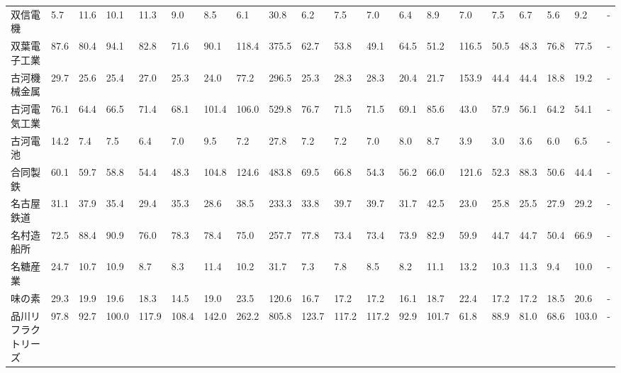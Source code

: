 \begin{longtable}[c]{lp{3mm}p{3mm}p{3mm}p{3mm}p{3mm}p{3mm}p{3mm}p{3mm}p{3mm}p{3mm}p{3mm}p{3mm}p{3mm}p{3mm}p{3mm}p{3mm}p{3mm}p{3mm}p{3mm}}
双信電機            &    5.7 &   11.6 &      10.1 &      11.3 &        9.0 &     8.5 &     6.1 &     30.8 &     6.2 &     7.5 &    7.0 &    6.4 &     8.9 &     7.0 &     7.5 &    6.7 &    5.6 &     9.2 &      - \\
双葉電子工業          &   87.6 &   80.4 &      94.1 &      82.8 &       71.6 &    90.1 &   118.4 &    375.5 &    62.7 &    53.8 &   49.1 &   64.5 &    51.2 &   116.5 &    50.5 &   48.3 &   76.8 &    77.5 &      - \\
古河機械金属          &   29.7 &   25.6 &      25.4 &      27.0 &       25.3 &    24.0 &    77.2 &    296.5 &    25.3 &    28.3 &   28.3 &   20.4 &    21.7 &   153.9 &    44.4 &   44.4 &   18.8 &    19.2 &      - \\
古河電気工業          &   76.1 &   64.4 &      66.5 &      71.4 &       68.1 &   101.4 &   106.0 &    529.8 &    76.7 &    71.5 &   71.5 &   69.1 &    85.6 &    43.0 &    57.9 &   56.1 &   64.2 &    54.1 &      - \\
古河電池            &   14.2 &    7.4 &       7.5 &       6.4 &        7.0 &     9.5 &     7.2 &     27.8 &     7.2 &     7.2 &    7.0 &    8.0 &     8.7 &     3.9 &     3.0 &    3.6 &    6.0 &     6.5 &      - \\
合同製鉄            &   60.1 &   59.7 &      58.8 &      54.4 &       48.3 &   104.8 &   124.6 &    483.8 &    69.5 &    66.8 &   54.3 &   56.2 &    66.0 &   121.6 &    52.3 &   88.3 &   50.6 &    44.4 &      - \\
名古屋鉄道           &   31.1 &   37.9 &      35.4 &      29.4 &       35.3 &    28.6 &    38.5 &    233.3 &    33.8 &    39.7 &   39.7 &   31.7 &    42.5 &    23.0 &    25.8 &   25.5 &   27.9 &    29.2 &      - \\
名村造船所           &   72.5 &   88.4 &      90.9 &      76.0 &       78.3 &    78.4 &    75.0 &    257.7 &    77.8 &    73.4 &   73.4 &   73.9 &    82.9 &    59.9 &    44.7 &   44.7 &   50.4 &    66.9 &      - \\
名糖産業            &   24.7 &   10.7 &      10.9 &       8.7 &        8.3 &    11.4 &    10.2 &     31.7 &     7.3 &     7.8 &    8.5 &    8.2 &    11.1 &    13.2 &    10.3 &   11.3 &    9.4 &    10.0 &      - \\
味の素             &   29.3 &   19.9 &      19.6 &      18.3 &       14.5 &    19.0 &    23.5 &    120.6 &    16.7 &    17.2 &   17.2 &   16.1 &    18.7 &    22.4 &    17.2 &   17.2 &   18.5 &    20.6 &      - \\
品川リフラクトリーズ      &   97.8 &   92.7 &     100.0 &     117.9 &      108.4 &   142.0 &   262.2 &    805.8 &   123.7 &   117.2 &  117.2 &   92.9 &   101.7 &    61.8 &    88.9 &   81.0 &   68.6 &   103.0 &      - \\

\end{longtable}
